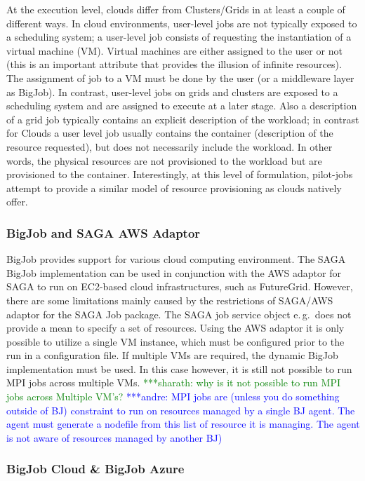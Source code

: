 \documentclass[conference,final]{IEEEtran}
\newcommand{\alnote}[1]{ {\textcolor{blue} { ***andre: #1 }}}
\newcommand{\smnote}[1]{ {\textcolor{green} { ***sharath: #1 }}}
\newcommand{\alnote}[1]{}
\newcommand{\smnote}[1]{}
\begin{document}
At the execution level, clouds differ from Clusters/Grids in at least a couple
of different ways. In cloud environments, user-level jobs are not typically
exposed to a scheduling system; a user-level job consists of requesting the
instantiation of a virtual machine (VM). Virtual machines are either assigned to
the user or not (this is an important attribute that provides the illusion of
infinite resources). The assignment of job to a VM must be done by the user (or
a middleware layer as BigJob). In contrast, user-level jobs on grids and 
clusters are exposed to a scheduling system and are
assigned to execute at a later stage. Also a description of a grid job typically
contains an explicit description of the workload; in contrast for Clouds a user
level job usually contains the container (description of the resource
requested), but does not necessarily include the workload. In other words, the
physical resources are not provisioned to the workload but are provisioned to
the container.  Interestingly, at this level of formulation, pilot-jobs attempt 
to provide a similar model of resource provisioning as clouds natively offer. 

\subsubsection{BigJob and SAGA AWS Adaptor}

BigJob provides support for various cloud computing environment. The SAGA BigJob
implementation can be used in conjunction with the AWS adaptor for SAGA to run
on EC2-based cloud infrastructures, such as FutureGrid. However, there are some 
limitations mainly caused by the restrictions of SAGA/AWS adaptor for the SAGA 
Job package. The SAGA job service object e.\,g.\ does not provide a mean to 
specify a set of resources. Using the AWS adaptor it is only possible to utilize 
a single VM instance, which must be configured prior to the run in a 
configuration file. If multiple VMs are required, the dynamic BigJob 
implementation must be used. In this case however, it is still not possible to 
run MPI jobs across multiple VMs. 
\smnote {why is it not possible to run MPI jobs across Multiple VM's?} \alnote{MPI jobs are (unless you do something outside of BJ) constraint to run
on resources managed by a single BJ agent. The agent must generate a nodefile
from this list of resource it is managing. The agent is not aware of resources
managed by another BJ)}

\subsubsection{BigJob Cloud \& BigJob Azure}
\end{document}

